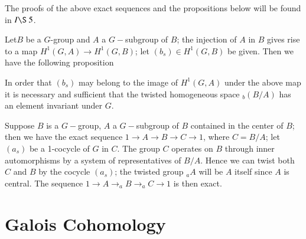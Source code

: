 The proofs of the above exact sequences and the propositions below
will be found in \cite{keyS2} $I \S ~5$. 

Let\pageoriginale $B$ be a $G$-group and $A$ a $G-$subgroup of $B$; the
injection of $A$ in $B$ gives rise to a  map $ H^1 (G,A) \rightarrow
H^1 (G,B)$; let $ (b_s)\in H^1 (G,B)$ be given. Then we have the
following proposition 

\begin{proposition}\label{chap1:prop1}%
In order that $(b_s)$ may belong to the image of $H^1 (G,A)$ under the
above map it is necessary and sufficient that the twisted homogeneous
space ${}_b(B/A)$ has an element invariant under $G$. 
\end{proposition}

Suppose $B$ is a $G-$group, $A$ a $G-$subgroup of $B$ contained in the
center of $B$; then we have the exact sequence 
$1 \rightarrow A\rightarrow B \rightarrow C \rightarrow 1$, where $C
= B/A$; let $(a_s)$ be a 1-cocycle of $G$ in $C$. The group $C$
operates on $B$ through inner automorphisms by a system of
representatives of $B/A$. Hence we can  twist both $C$ and $B$ by the
cocycle $(a_s)$; the twisted group  $_{a}A$ will be $A$ itself since
$A$ is central. The sequence  
$1 \rightarrow A \rightarrow _{a}B \rightarrow _{a}C \rightarrow 1$ is
then exact. 


\section{Galois Cohomology}\label{chap1:sec1.6}

